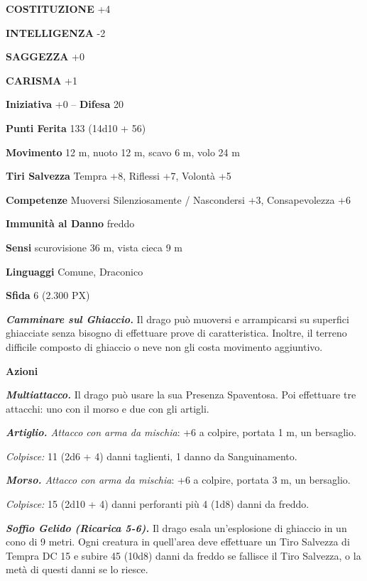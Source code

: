 \begin{multicols}{2}
\textbf{COSTITUZIONE} +4

\textbf{INTELLIGENZA} -2

\textbf{SAGGEZZA} +0

\textbf{CARISMA} +1

\textbf{Iniziativa} +0 -- \textbf{Difesa} 20

\textbf{Punti Ferita} 133 (14d10 + 56)

\textbf{Movimento} 12 m, nuoto 12 m, scavo 6 m, volo 24 m

\textbf{Tiri Salvezza} Tempra +8, Riflessi +7, Volontà +5

\textbf{Competenze} Muoversi Silenziosamente / Nascondersi +3, Consapevolezza +6

\textbf{Immunità al Danno} freddo

\textbf{Sensi} scurovisione 36 m, vista cieca 9 m

\textbf{Linguaggi} Comune, Draconico

\textbf{Sfida} 6 (2.300 PX)

\textit{\textbf{Camminare sul Ghiaccio.}} Il drago può muoversi e arrampicarsi su superfici ghiacciate senza bisogno di effettuare prove di caratteristica. Inoltre, il terreno difficile composto di ghiaccio o neve non gli costa movimento aggiuntivo.

\textbf{Azioni}

\textit{\textbf{Multiattacco.}} Il drago può usare la sua Presenza Spaventosa. Poi effettuare tre attacchi: uno con il morso e due con gli artigli.

\textit{\textbf{Artiglio.} Attacco con arma da mischia}: +6 a colpire, portata 1 m, un bersaglio.

\textit{Colpisce:} 11 (2d6 + 4) danni taglienti, 1 danno da Sanguinamento.

\textit{\textbf{Morso.} Attacco con arma da mischia}: +6 a colpire, portata 3 m, un bersaglio.

\textit{Colpisce:} 15 (2d10 + 4) danni perforanti più 4 (1d8) danni da freddo.

\textit{\textbf{Soffio Gelido (Ricarica 5-6).}} Il drago esala un'esplosione di ghiaccio in un cono di 9 metri. Ogni creatura in quell'area deve effettuare un Tiro Salvezza di Tempra DC 15 e subire 45 (10d8) danni da freddo se fallisce il Tiro Salvezza, o la metà di questi danni se lo riesce.


\end{multicols}
